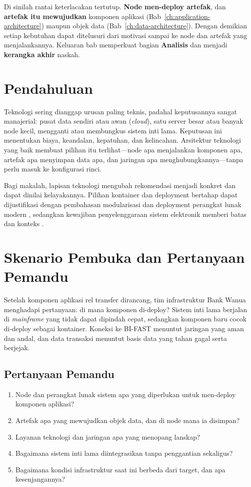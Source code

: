 Di sinilah rantai keterlacakan tertutup. \textbf{Node men-deploy artefak}, dan
\textbf{artefak itu mewujudkan} komponen aplikasi
(Bab~\ref{ch:application-architecture}) maupun objek data
(Bab~\ref{ch:data-architecture}). Dengan demikian setiap kebutuhan dapat
ditelusuri dari motivasi sampai ke node dan artefak yang menjalankannya.
Keluaran bab memperkuat bagian \textbf{Analisis} dan menjadi \textbf{kerangka
akhir} naskah.

\section{Pendahuluan}

Teknologi sering dianggap urusan paling teknis, padahal keputusannya sangat
manajerial: pusat data sendiri atau awan (\emph{cloud}), satu server besar atau
banyak node kecil, mengganti atau membungkus sistem inti lama. Keputusan ini
menentukan biaya, keandalan, kepatuhan, dan kelincahan. Arsitektur teknologi yang
baik membuat pilihan itu terlihat---node apa menjalankan komponen apa, artefak
apa menyimpan data apa, dan jaringan apa menghubungkannya---tanpa perlu masuk ke
konfigurasi rinci.

Bagi makalah, lapisan teknologi mengubah rekomendasi menjadi konkret dan dapat
dinilai kelayakannya. Pilihan kontainer dan deployment bertahap dapat
dijustifikasi dengan pembahasan modularisasi dan deployment perangkat lunak
modern \cite{newman2021building}, sedangkan kewajiban penyelenggaraan sistem
elektronik memberi batas dan konteks \cite{pp712019}.

\section{Skenario Pembuka dan Pertanyaan Pemandu}

Setelah komponen aplikasi rel transfer dirancang, tim infrastruktur Bank Wanua
menghadapi pertanyaan: di mana komponen di-deploy? Sistem inti lama berjalan di
\emph{mainframe} yang tidak dapat dipindah cepat, sedangkan komponen baru cocok
di-deploy sebagai kontainer. Koneksi ke BI-FAST menuntut jaringan yang aman dan
andal, dan data transaksi menuntut basis data yang tahan gagal serta berjejak.

\subsection*{Pertanyaan Pemandu}
\begin{enumerate}
  \item Node dan perangkat lunak sistem apa yang diperlukan untuk men-deploy
        komponen aplikasi?
  \item Artefak apa yang mewujudkan objek data, dan di node mana ia disimpan?
  \item Layanan teknologi dan jaringan apa yang menopang lanskap?
  \item Bagaimana sistem inti lama diintegrasikan tanpa penggantian sekaligus?
  \item Bagaimana kondisi infrastruktur saat ini berbeda dari target, dan apa
        kesenjangannya?
\end{enumerate}

